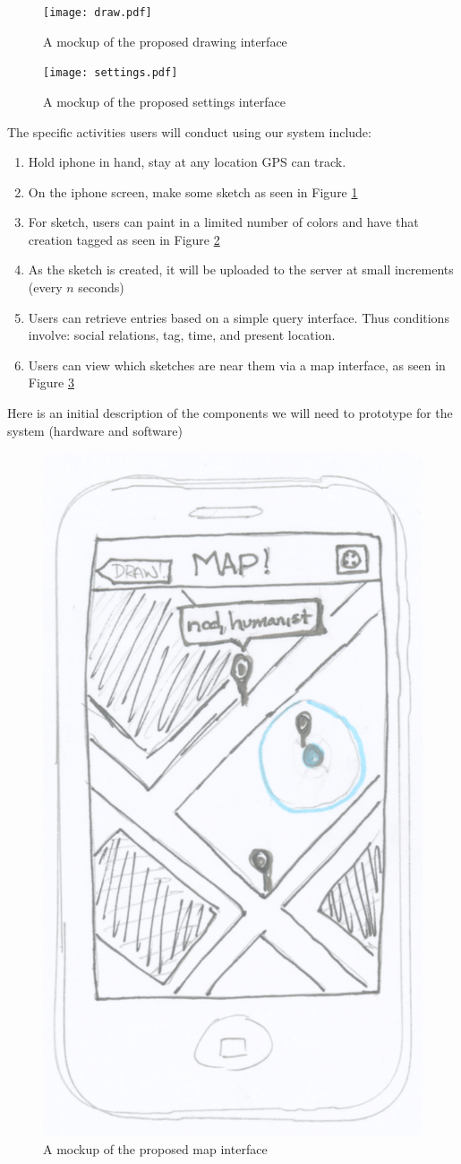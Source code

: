 \documentclass{chi2009}
\begin{document}
\begin{figure}
\centering
\texttt{[image: draw.pdf]}
\caption{A mockup of the proposed drawing interface}
\label{fig:draw}
\end{figure}

\begin{figure}
\centering
\texttt{[image: settings.pdf]}
\caption{A mockup of the proposed settings interface}
\label{fig:settings}
\end{figure}

The specific activities users will conduct using our system include:
\begin{enumerate}
\item Hold iphone in hand, stay at any location GPS can track.
\item On the iphone screen, make some sketch as seen in Figure \ref{fig:draw}
\item For sketch, users can paint in a limited number of colors and have that
	creation tagged as seen in Figure \ref{fig:settings}
\item As the sketch is created, it will be uploaded to the server at small
	increments (every $n$ seconds)
\item Users can retrieve entries based on a simple query interface. Thus
	conditions involve: social relations, tag, time, and present location.
\item Users can view which sketches are near them via a map interface, as seen
	in Figure \ref{fig:map}
\end{enumerate}

Here is an initial description of the components we will need to prototype for
the system (hardware and software)

\begin{figure}
\centering
\includegraphics[width=.3\textwidth]{map.pdf}
\caption{A mockup of the proposed map interface}
\label{fig:map}
\end{figure}
\end{document}
